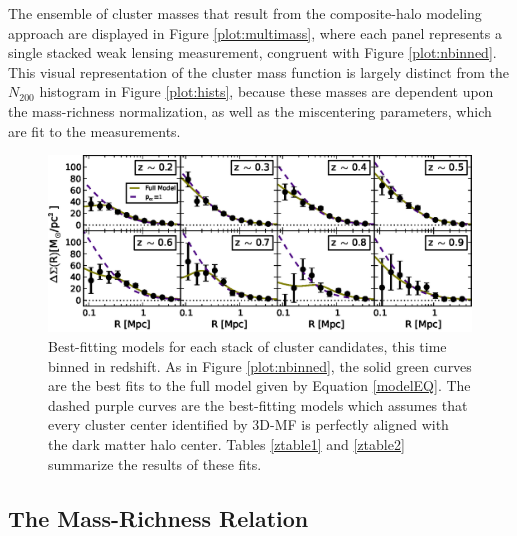 The ensemble of cluster masses that result from the composite-halo modeling approach are displayed in Figure \ref{plot:multimass}, where each panel represents a single stacked weak lensing measurement, congruent with Figure \ref{plot:nbinned}. This visual representation of the cluster mass function is largely distinct from the $N_{200}$ histogram in Figure \ref{plot:hists}, because these masses are dependent upon the mass-richness normalization, as well as the miscentering parameters, which are fit to the measurements.


\begin{figure}
\begin{center}
  \includegraphics[scale=1.0]{plots_ch4/shearFit_zpanels_fcc0and1_slopeMN1p5_DuttonMaccio.eps}
  \caption[Shear for Redshift-Binned Clusters]{Best-fitting models for each stack of cluster candidates, this time binned in redshift. As in Figure \ref{plot:nbinned}, the solid green curves are the best fits to the full model given by Equation \ref{modelEQ}. The dashed purple curves are the best-fitting models which assumes that every cluster center identified by \ac{3D-MF} is perfectly aligned with the dark matter halo center. Tables \ref{ztable1} and \ref{ztable2} summarize the results of these fits.}
\label{plot:zbinned}
\end{center}
\end{figure}


\subsection{The Mass-Richness Relation}

